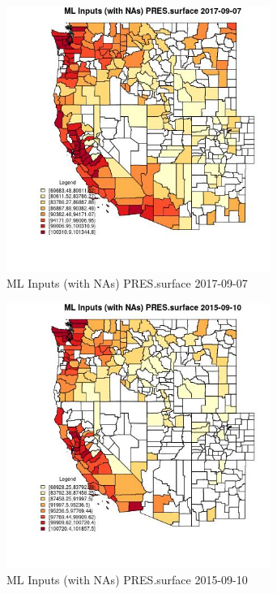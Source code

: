 \begin{figure} 
\centering  
\includegraphics[width=0.77\textwidth]{Code_Outputs/Report_ML_input_PM25_Step4_part_e_de_duplicated_aves_compiled_2019-05-21wNAs_CountyPRESsurfaceMean2017-09-07.jpg} 
\caption{\label{fig:Report_ML_input_PM25_Step4_part_e_de_duplicated_aves_compiled_2019-05-21wNAsCountyPRESsurfaceMean2017-09-07}ML Inputs (with NAs) PRES.surface 2017-09-07} 
\end{figure} 
 

\begin{figure} 
\centering  
\includegraphics[width=0.77\textwidth]{Code_Outputs/Report_ML_input_PM25_Step4_part_e_de_duplicated_aves_compiled_2019-05-21wNAs_CountyPRESsurfaceMean2015-09-10.jpg} 
\caption{\label{fig:Report_ML_input_PM25_Step4_part_e_de_duplicated_aves_compiled_2019-05-21wNAsCountyPRESsurfaceMean2015-09-10}ML Inputs (with NAs) PRES.surface 2015-09-10} 
\end{figure} 
 

